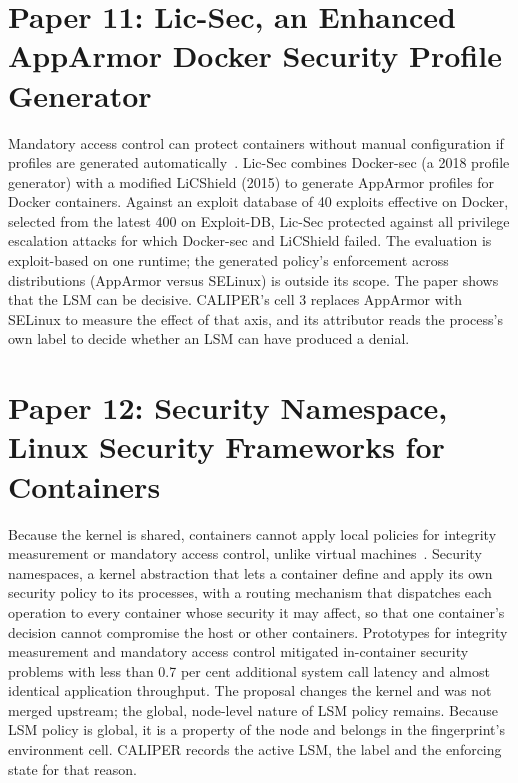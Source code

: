 \section{Paper 11: Lic-Sec, an Enhanced AppArmor Docker Security Profile Generator}
\label{lit:licsec}

 Mandatory access control can protect containers without manual configuration if profiles are generated automatically~\cite{licsec}.
 Lic-Sec combines Docker-sec (a 2018 profile generator) with a modified LiCShield (2015) to generate AppArmor profiles for Docker containers.
 Against an exploit database of 40 exploits effective on Docker, selected from the latest 400 on Exploit-DB, Lic-Sec protected against all privilege escalation attacks for which Docker-sec and LiCShield failed.
 The evaluation is exploit-based on one runtime; the generated policy's enforcement across distributions (AppArmor versus SELinux) is outside its scope.
 The paper shows that the LSM can be decisive. CALIPER's cell 3 replaces AppArmor with SELinux to measure the effect of that axis, and its attributor reads the process's own label to decide whether an LSM can have produced a denial.

\section{Paper 12: Security Namespace, Linux Security Frameworks for Containers}
\label{lit:secns}

 Because the kernel is shared, containers cannot apply local policies for integrity measurement or mandatory access control, unlike virtual machines~\cite{sun2018secns}.
 Security namespaces, a kernel abstraction that lets a container define and apply its own security policy to its processes, with a routing mechanism that dispatches each operation to every container whose security it may affect, so that one container's decision cannot compromise the host or other containers.
 Prototypes for integrity measurement and mandatory access control mitigated in-container security problems with less than 0.7 per cent additional system call latency and almost identical application throughput.
 The proposal changes the kernel and was not merged upstream; the global, node-level nature of LSM policy remains.
 Because LSM policy is global, it is a property of the node and belongs in the fingerprint's environment cell. CALIPER records the active LSM, the label and the enforcing state for that reason.

